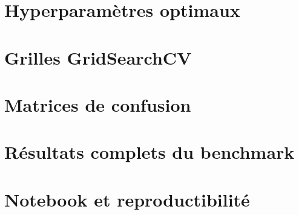 \chapter{Hyperparamètres optimaux}
\aCompleter

\chapter{Grilles GridSearchCV}
\aCompleter

\chapter{Matrices de confusion}
\aCompleter

\chapter{Résultats complets du benchmark}
\label{annex:benchmark-results}
\aCompleter

\chapter{Notebook et reproductibilité}
\aCompleter
